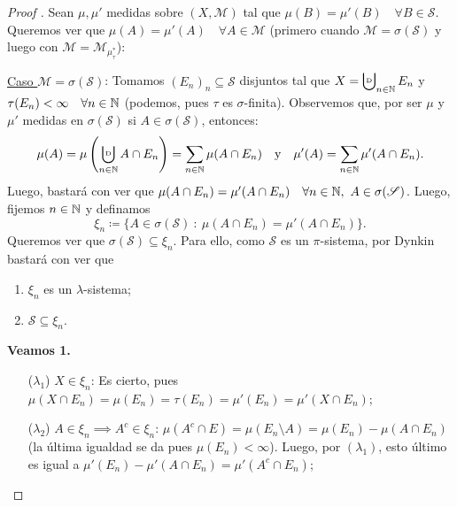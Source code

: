 \begin{proof}[Proof ]
	Sean $\mu,\mu'$ medidas sobre $(X, \mathscr{M})$ tal que $\mu(B) = \mu'(B) \quad \forall B \in \mathscr{S}$. Queremos ver que $\mu(A) = \mu'(A) \quad \forall A \in \mathscr{M}$ (primero cuando $\mathscr{M} = \sigma(\mathscr{S})$ y luego con $\mathscr{M} = \mathscr{M}_{\mu^{*}_{\tau}}$): \par
	\smallskip
	\underline{Caso $\mathscr{M} = \sigma(\mathscr{S})$}: Tomamos $(E_n)_n \subseteq \mathscr{S}$ disjuntos tal que $X = \bigcupd_{n\in\N} E_n$ y $\tau(E_n) < \infty \quad \forall n\in\mathbb{N}$ (podemos, pues $\tau$ es $\sigma$-finita). Observemos que, por ser $\mu$ y $\mu'$ medidas en $\sigma(\mathscr{S})$ si $A \in \sigma(\mathscr{S})$, entonces:
	\[ \mu(A) = \mu \left( \bigcupd_{n\in\N} A \cap E_n \right) = \sum_{n\in\N} \mu(A \cap E_n) \quad \text{y} \quad \mu'(A) = \sum_{n\in\N} \mu'(A \cap E_n). \]
	Luego, bastará con ver que $\mu(A \cap E_n) = \mu'(A \cap E_n) \quad \forall n \in \mathbb{N},\ A \in \sigma(\mathscr{S})$. Luego, fijemos $n\in\mathbb{N}$ y definamos
	\[ \xi_n \coloneq \{A \in \sigma(\mathscr{S}) \ : \ \mu(A \cap E_n) = \mu'(A \cap E_n)\}. \]
	Queremos ver que $\sigma(\mathscr{S}) \subseteq \xi_n$. Para ello, como $\mathscr{S}$ es un $\pi$-sistema, por Dynkin bastará con ver que
	\begin{enumerate}
		\item $\xi_n$ es un $\lambda$-sistema;

		\item $\mathscr{S} \subseteq \xi_n$.
	\end{enumerate}
	\textbf{Veamos 1.}
	\begin{enumerate}
		\item[($\lambda_{1}$)] $X \in \xi_n$: Es cierto, pues $\mu(X \cap E_n) = \mu(E_n) = \tau(E_n) = \mu'(E_n) = \mu'(X \cap E_n)$;

		\item[($\lambda_{2}$)] $A \in \xi_n \implies A^c \in \xi_n$: $\mu(A^c \cap E) = \mu(E_n \setminus A) = \mu(E_n) - \mu(A \cap E_n)$ (la última igualdad se da pues $\mu(E_n) < \infty$). Luego, por $(\lambda_{1})$, esto último es igual a $\mu'(E_n) - \mu'(A \cap E_n) = \mu'(A^c \cap E_n)$;


\end{enumerate}
\end{proof}
